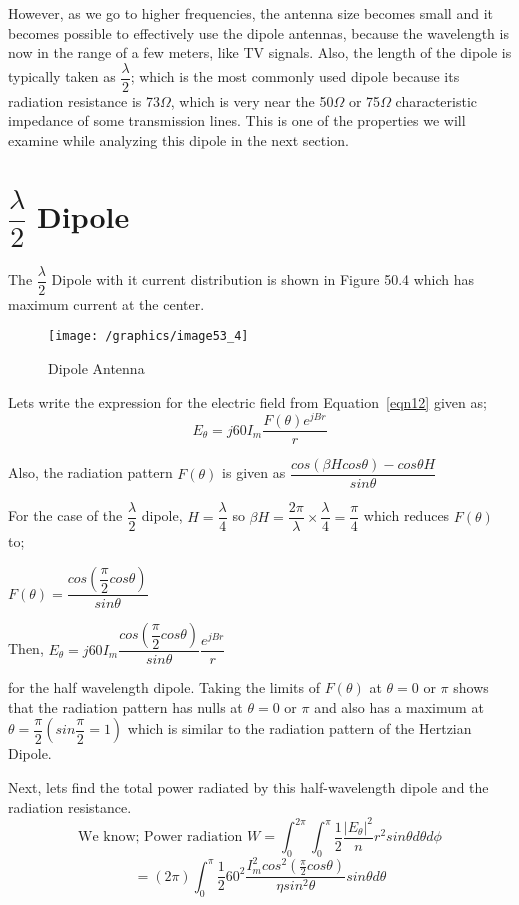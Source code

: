 However, as we go to higher frequencies, the antenna size becomes small and it becomes possible to effectively use the dipole antennas, because the wavelength is now in the range of a few meters, like TV signals. Also, the length of the dipole is typically taken as $\dfrac{\lambda}{2}$; which is the most commonly used dipole because its radiation resistance is 73$\Omega$, which is very near the 50$\Omega$ or 75$\Omega$ characteristic impedance of some transmission lines. This is one of the properties we will examine while analyzing this dipole in the next section.
\section{$\dfrac{\lambda}{2}$ Dipole}
The $\dfrac{\lambda}{2}$ Dipole with it current distribution is shown in Figure 50.4 which has maximum current at the center.
\begin{figure}[h]
\centering
\texttt{[image: /graphics/image53\_4]}
\caption{Dipole Antenna}
\label{fig:fig4}
\end{figure}
Lets write the expression for the electric field from Equation~\ref{eqn12} given as; 
\begin{equation*}
E_\theta = j60I_m \frac{F(\theta)e^{jBr}}{r}
\end{equation*}
\begin{center}
Also, the radiation pattern $F(\theta)$ is given as $\dfrac{cos(\beta H cos\theta) - cos\theta H}{sin \theta}$

For the case of the $\dfrac{\lambda}{2}$ dipole, $H = \dfrac{\lambda}{4}$ so $\beta H = \dfrac{2\pi}{\lambda} \times \dfrac{\lambda}{4}= \dfrac{\pi}{4} $ which reduces $F(\theta)$ to;

$F(\theta) = \dfrac{cos (\dfrac{\pi}{2} cos\theta)}{sin\theta}$

Then, $E_\theta = j60I_m \dfrac{cos (\dfrac{\pi}{2} cos\theta)}{sin\theta} \dfrac{e^{jBr}}{r}$ 
\end{center}for the half wavelength dipole.
Taking the limits of $F(\theta)$ at $\theta = 0$ or $\pi$ shows that the radiation pattern has nulls at $\theta = 0 \text{ or } \pi$ and also has a maximum at $\theta = \dfrac{\pi}{2} (sin \dfrac{\pi}{2} = 1)$ which is similar to the radiation pattern of the Hertzian Dipole.

Next, lets find the total power radiated by this half-wavelength dipole and the radiation resistance. 
\[ \text{We know; Power radiation } W = \int_0^{2\pi}\int_{0}^{\pi} \frac{1}{2}\frac{|E_\theta|^2}{n}r^2sin\theta d\theta d\phi \]
\[ = (2\pi)\int_{0}^{\pi} \frac{1}{2} 60^2 \frac{I_m^2cos^2(\frac{\pi}{2}cos\theta)}{\eta sin^2\theta}sin\theta d\theta \]

